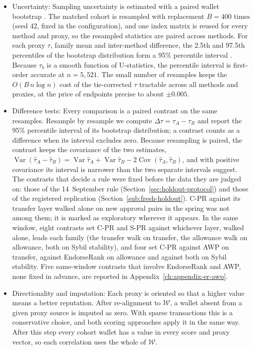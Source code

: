 \begin{itemize}
\item Uncertainty: Sampling uncertainty is estimated with a paired wallet bootstrap . The matched cohort is resampled with replacement $B=400$ times (seed 42, fixed in the configuration), and one index matrix is reused for every method and proxy, so the resampled statistics are paired across methods. For each proxy $\tau$, family mean and inter-method difference, the 2.5th and 97.5th percentiles of the bootstrap distribution form a 95\% percentile interval . Because $\tau_b$ is a smooth function of U-statistics, the percentile interval is first-order accurate at $n=5{,}521$. The small number of resamples keeps the $O(B\,n\log n)$ cost of the tie-corrected $\tau$ tractable across all methods and proxies, at the price of endpoints precise to about $\pm 0.005$.

\item Difference tests: Every comparison is a paired contrast on the same resamples. Resample by resample we compute $\Delta\tau=\tau_A-\tau_B$ and report the 95\% percentile interval of its bootstrap distribution; a contrast counts as a difference when its interval excludes zero. Because resampling is paired, the contrast keeps the covariance of the two estimates, $\operatorname{Var}(\hat\tau_A-\hat\tau_B)=\operatorname{Var}\hat\tau_A+\operatorname{Var}\hat\tau_B-2\operatorname{Cov}(\hat\tau_A,\hat\tau_B)$, and with positive covariance its interval is narrower than the two separate intervals suggest. The contrasts that decide a rule were fixed before the data they are judged on: those of the 14~September rule (Section~\ref{sec:holdout-protocol}) and those of the registered replication (Section~\ref{sub:fresh-holdout}). C-PR against its transfer layer walked alone on new approval pairs in the spring was not among them; it is marked as exploratory wherever it appears. In the same window, eight contrasts set C-PR and S-PR against whichever layer, walked alone, leads each family (the transfer walk on transfer, the allowance walk on allowance, both on Sybil stability), and four set C-PR against AWP on transfer, against EndorseRank on allowance and against both on Sybil stability. Five same-window contrasts that involve EndorseRank and AWP, none fixed in advance, are reported in Appendix~\ref{ch:appendix-er-awp}.

\item Directionality and imputation: Each proxy is oriented so that a higher value means a better reputation. After re-alignment to $\mathcal{W}$, a wallet absent from a given proxy source is imputed as zero. With sparse transactions this is a conservative choice, and both scoring approaches apply it in the same way. After this step every cohort wallet has a value in every score and proxy vector, so each correlation uses the whole of $\mathcal{W}$.


\end{itemize}
